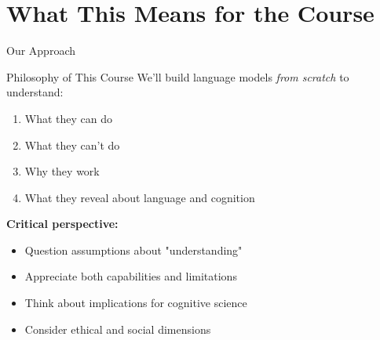 \documentclass[aspectratio=169]{beamer}
\begin{document}
\section{What This Means for the Course}

\begin{frame}[shrink=10]{Our Approach 🎯}
\small
\begin{block}{Philosophy of This Course}
We'll build language models \textit{from scratch} to understand:
\begin{enumerate}\setlength{\itemsep}{0pt}\setlength{\itemsep}{0pt}
    \item What they can do
    \item What they can't do
    \item Why they work
    \item What they reveal about language and cognition
\end{enumerate}
\end{block}

\vspace{0.3cm}

\textbf{Critical perspective:}
\begin{itemize}\setlength{\itemsep}{0pt}\setlength{\itemsep}{0pt}
    \item Question assumptions about "understanding"
    \item Appreciate both capabilities and limitations
    \item Think about implications for cognitive science
    \item Consider ethical and social dimensions
\end{itemize}
\end{frame}
\end{document}
